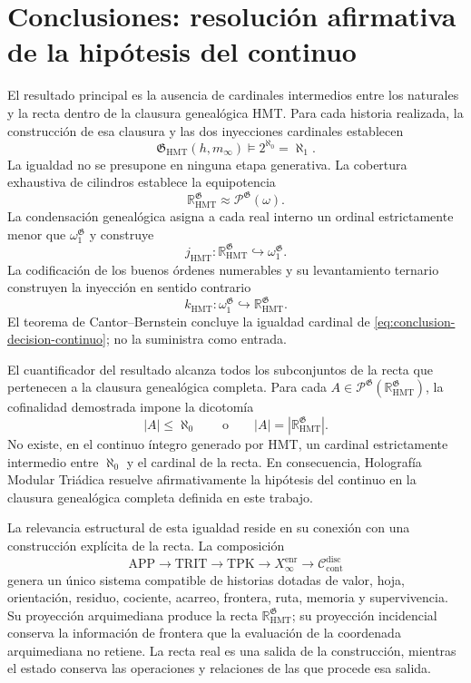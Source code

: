 \section{Conclusiones: resolución afirmativa de la hipótesis del continuo}
\label{sec:conclusiones-ch}
\begingroup
\fontsize{10.5}{13.4}\selectfont
\setlength{\parskip}{3pt}
\setlength{\abovedisplayskip}{5pt}
\setlength{\belowdisplayskip}{5pt}

El resultado principal es la ausencia de cardinales intermedios entre los
naturales y la recta dentro de la clausura genealógica HMT. Para cada historia
realizada, la construcción de esa clausura y las dos inyecciones cardinales
establecen
\begin{equation}
 \boxed{
 \mathfrak G_{\mathrm{HMT}}(h,m_\infty)
 \models 2^{\aleph_0}=\aleph_1 .}
 \label{eq:conclusion-decision-continuo}
\end{equation}
La igualdad no se presupone en ninguna etapa generativa. La cobertura
exhaustiva de cilindros establece la equipotencia
\[
 \mathbb R_{\mathrm{HMT}}^{\mathfrak G}
 \approx\mathcal P^{\mathfrak G}(\omega).
\]
La condensación genealógica asigna a cada real interno un ordinal estrictamente
menor que \(\omega_1^{\mathfrak G}\) y construye
\[
 j_{\mathrm{HMT}}:
 \mathbb R_{\mathrm{HMT}}^{\mathfrak G}\hookrightarrow
 \omega_1^{\mathfrak G}.
\]
La codificación de los buenos órdenes numerables y su levantamiento ternario
construyen la inyección en sentido contrario
\[
 k_{\mathrm{HMT}}:
 \omega_1^{\mathfrak G}\hookrightarrow
 \mathbb R_{\mathrm{HMT}}^{\mathfrak G}.
\]
El teorema de Cantor--Bernstein concluye la igualdad cardinal de
\eqref{eq:conclusion-decision-continuo}; no la suministra como entrada.

El cuantificador del resultado alcanza todos los subconjuntos de la recta que
pertenecen a la clausura genealógica completa. Para cada
\(A\in\mathcal P^{\mathfrak G}
(\mathbb R_{\mathrm{HMT}}^{\mathfrak G})\), la cofinalidad demostrada impone
la dicotomía
\[
 |A|\leq\aleph_0
 \qquad\text{o}\qquad
 |A|=|\mathbb R_{\mathrm{HMT}}^{\mathfrak G}|.
\]
No existe, en el continuo íntegro generado por HMT, un cardinal estrictamente
intermedio entre \(\aleph_0\) y el cardinal de la recta. En consecuencia,
Holografía Modular Triádica resuelve afirmativamente la hipótesis del
continuo en la clausura genealógica completa definida en este trabajo.

La relevancia estructural de esta igualdad reside en su conexión con una
construcción explícita de la recta. La composición
\[
 \mathrm{APP}\longrightarrow\mathrm{TRIT}\longrightarrow\mathrm{TPK}
 \longrightarrow X_\infty^{\mathrm{enr}}
 \longrightarrow\mathcal C_{\mathrm{cont}}^{\mathrm{disc}}
\]
genera un único sistema compatible de historias dotadas de valor, hoja,
orientación, residuo, cociente, acarreo, frontera, ruta, memoria y
supervivencia. Su proyección arquimediana produce la recta
\(\mathbb R_{\mathrm{HMT}}^{\mathfrak G}\); su proyección incidencial conserva
la información de frontera que la evaluación de la coordenada arquimediana no retiene. La recta
real es una salida de la construcción, mientras el estado conserva las
operaciones y relaciones de las que procede esa salida.

